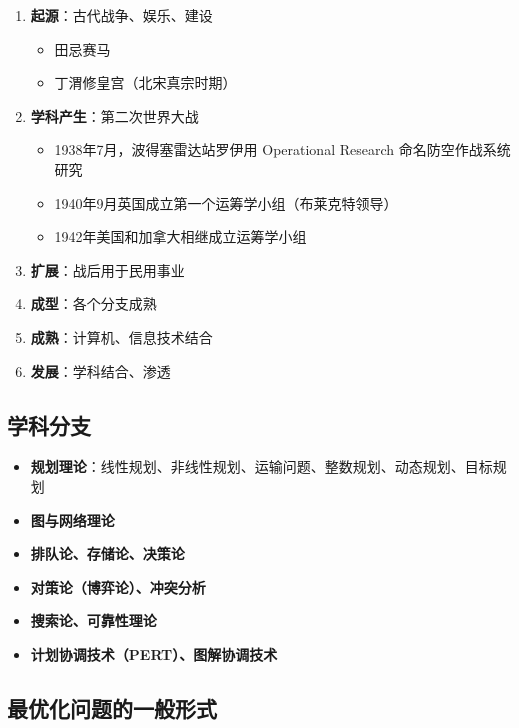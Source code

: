 \begin{notebox}[历史脉络]
\begin{enumerate}[label=\arabic*., leftmargin=2em]
    \item \textbf{起源}：古代战争、娱乐、建设
    \begin{itemize}
        \item 田忌赛马
        \item 丁渭修皇宫（北宋真宗时期）
    \end{itemize}
    \item \textbf{学科产生}：第二次世界大战
    \begin{itemize}
        \item 1938年7月，波得塞雷达站罗伊用 Operational Research 命名防空作战系统研究
        \item 1940年9月英国成立第一个运筹学小组（布莱克特领导）
        \item 1942年美国和加拿大相继成立运筹学小组
    \end{itemize}
    \item \textbf{扩展}：战后用于民用事业
    \item \textbf{成型}：各个分支成熟
    \item \textbf{成熟}：计算机、信息技术结合
    \item \textbf{发展}：学科结合、渗透
\end{enumerate}
\end{notebox}

\subsection{学科分支}

\begin{conceptbox}[运筹学主要分支]
\begin{itemize}[itemsep=0.2em]
    \item \textbf{规划理论}：线性规划、非线性规划、运输问题、整数规划、动态规划、目标规划
    \item \textbf{图与网络理论}
    \item \textbf{排队论、存储论、决策论}
    \item \textbf{对策论（博弈论）、冲突分析}
    \item \textbf{搜索论、可靠性理论}
    \item \textbf{计划协调技术（PERT）、图解协调技术}
\end{itemize}
\end{conceptbox}

\subsection{最优化问题的一般形式}


